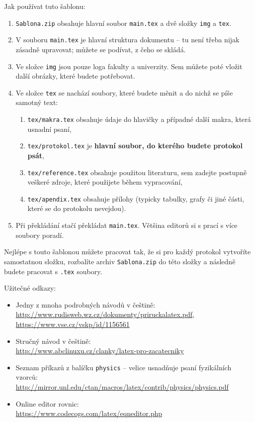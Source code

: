 		Jak používat tuto šablonu:
		\begin{enumerate}
		\item \verb|Sablona.zip| obsahuje hlavní soubor \verb|main.tex| a dvě složky \verb|img| a \verb|tex|. 
		\item V souboru \verb|main.tex| je hlavní struktura dokumentu -- tu není třeba nijak zásadně upravovat; můžete se podívat, z čeho se skládá.
		\item Ve složce \verb|img| jsou pouze loga fakulty a univerzity.  Sem můžete poté vložit další obrázky, které budete potřebovat.
		\item Ve složce \verb|tex| se nachází soubory, které budete měnit a do nichž se píše samotný text:
			\begin{enumerate}
			\item \verb|tex/makra.tex| obsahuje údaje do hlavičky a případné další makra, která usnadní psaní,
			\item \verb|tex/protokol.tex| je \textbf{hlavní soubor, do kterého budete protokol psát},
			\item \verb|tex/reference.tex| obsahuje použitou literaturu, sem zadejte postupně veškeré zdroje, které použijete během vypracování,
			\item \verb|tex/apendix.tex| obsahuje přílohy (typicky tabulky, grafy či jiné části, které se do protokolu nevejdou).
			\end{enumerate}
		\item Při překládání stačí překládat  \verb|main.tex|. Většina editorů si s prací s více soubory poradí.
		\end{enumerate}
		Nejlépe s touto šablonou můžete pracovat tak, že si pro každý protokol vytvoříte samostatnou složku, rozbalíte archiv \verb|Sablona.zip| do této složky a následně budete pracovat s \verb|.tex| soubory.
		
		Užitečné odkazy:
		\begin{itemize}
		\item Jedny z mnoha podrobných návodů v češtině: \\
		\url{http://www.rudisweb.wz.cz/dokumenty/priruckalatex.pdf}, \url{https://www.vse.cz/vskp/id/1156561}
		\item Stručný návod v češtině: \\
		\url{http://www.abclinuxu.cz/clanky/latex-pro-zacatecniky}
		\item Seznam příkazů z balíčku \verb|physics| -- velice usnadňuje psaní fyzikálních vzorců:\\
		\url{http://mirror.unl.edu/ctan/macros/latex/contrib/physics/physics.pdf}
		\item Online editor rovnic: \\
		 \url{https://www.codecogs.com/latex/eqneditor.php}
		\end{itemize}
		
